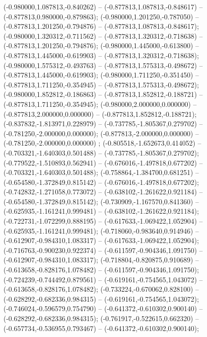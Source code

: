  (-0.980000,1.087813,-0.840262) -- (-0.877813,1.087813,-0.848617) -- (-0.877813,0.980000,-0.879863);
 (-0.980000,1.201250,-0.787050) -- (-0.877813,1.201250,-0.794876) -- (-0.877813,1.087813,-0.848617);
 (-0.980000,1.320312,-0.711562) -- (-0.877813,1.320312,-0.718638) -- (-0.877813,1.201250,-0.794876);
 (-0.980000,1.445000,-0.613800) -- (-0.877813,1.445000,-0.619903) -- (-0.877813,1.320312,-0.718638);
 (-0.980000,1.575312,-0.493763) -- (-0.877813,1.575313,-0.498672) -- (-0.877813,1.445000,-0.619903);
 (-0.980000,1.711250,-0.351450) -- (-0.877813,1.711250,-0.354945) -- (-0.877813,1.575313,-0.498672);
 (-0.980000,1.852812,-0.186863) -- (-0.877813,1.852812,-0.188721) -- (-0.877813,1.711250,-0.354945);
 (-0.980000,2.000000,0.000000) -- (-0.877813,2.000000,0.000000) -- (-0.877813,1.852812,-0.188721);
 (-0.837832,-1.813971,0.228979) -- (-0.737785,-1.805367,0.279702) -- (-0.781250,-2.000000,0.000000);
 (-0.877813,-2.000000,0.000000) -- (-0.781250,-2.000000,0.000000) ;
 (-0.805518,-1.652673,0.414052) -- (-0.703321,-1.640303,0.501488) -- (-0.737785,-1.805367,0.279702);
 (-0.779522,-1.510893,0.562941) -- (-0.676016,-1.497818,0.677202) -- (-0.703321,-1.640303,0.501488);
 (-0.758864,-1.384700,0.681251) -- (-0.654580,-1.372849,0.815142) -- (-0.676016,-1.497818,0.677202);
 (-0.742832,-1.271058,0.773072) -- (-0.638102,-1.261622,0.921184) -- (-0.654580,-1.372849,0.815142);
 (-0.730909,-1.167570,0.841360) -- (-0.625935,-1.161241,0.999481) -- (-0.638102,-1.261622,0.921184);
 (-0.722731,-1.072299,0.888195) -- (-0.617633,-1.069422,1.052904) -- (-0.625935,-1.161241,0.999481);
 (-0.718060,-0.983640,0.914946) -- (-0.612907,-0.984310,1.083317) -- (-0.617633,-1.069422,1.052904);
 (-0.716763,-0.900230,0.922374) -- (-0.611597,-0.904346,1.091750) -- (-0.612907,-0.984310,1.083317);
 (-0.718804,-0.820875,0.910689) -- (-0.613658,-0.828176,1.078482) -- (-0.611597,-0.904346,1.091750);
 (-0.724239,-0.744492,0.879561) -- (-0.619161,-0.754565,1.043072) -- (-0.613658,-0.828176,1.078482);
 (-0.733224,-0.670062,0.828100) -- (-0.628292,-0.682336,0.984315) -- (-0.619161,-0.754565,1.043072);
 (-0.746024,-0.596579,0.754790) -- (-0.641372,-0.610302,0.900140) -- (-0.628292,-0.682336,0.984315);
 (-0.761917,-0.522615,0.662320) -- (-0.657734,-0.536955,0.793467) -- (-0.641372,-0.610302,0.900140);
